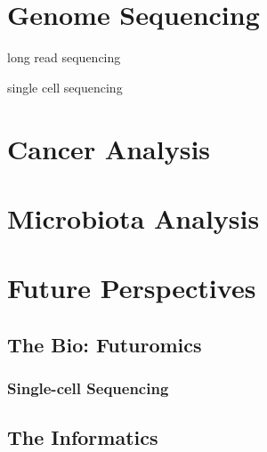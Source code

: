 \section{Genome Sequencing}

long read sequencing

single cell sequencing

\section{Cancer Analysis}

\section{Microbiota Analysis}


\section{Future Perspectives}
\subsection{The Bio: Futuromics}

\subsubsection{Single-cell Sequencing}

\subsection{The Informatics}
\begin{comment}
- bigger better more RAM/CPU to keep up with the ever increasing data sizes, cloudification
- make it usable - the biologists have the knowledge for interpretation, software should be
  usable by them, not just bioinformaticians, Galaxy/docker/conda etc helps with this
- make it maintainable as developers by adhering to coding best-practices and through the
  use of continuous integration strategies>
- training is vital, the more complex these data and methods get, the harder it will be to
  draw accurate conclusions>
- quantum computing? blockchain? the future or just hype?
\end{comment}

